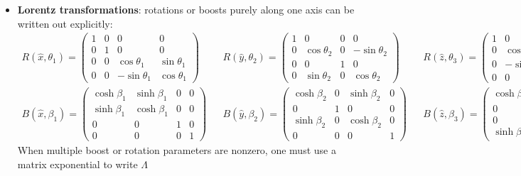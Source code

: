 \documentclass[12pt, oneside]{article}   	%
\theoremstyle{definition}
\begin{document}
\begin{itemize}
	\item \textbf{Lorentz transformations}: rotations or boosts purely along one axis can be written out explicitly:
	\tiny
	\begin{align}
		R(\hat x, \theta_1) = \begin{pmatrix} 1 & 0 & 0 & 0 \\ 0 & 1 & 0 & 0 \\ 0 & 0 & \cos\theta_1 & \sin\theta_1 \\ 0 & 0 & -\sin\theta_1 & \cos\theta_1 \end{pmatrix} 
		&&
		R(\hat y, \theta_2) = \begin{pmatrix} 1 & 0 & 0 & 0 \\ 0 & \cos\theta_2 & 0 & -\sin\theta_2 \\ 0 & 0 & 1 & 0 \\ 0 & \sin\theta_2 & 0 & \cos\theta_2 \end{pmatrix} 
		&&
		R(\hat z, \theta_3) = \begin{pmatrix} 1 & 0 & 0 & 0 \\ 0 & \cos\theta_3 & \sin\theta_3 & 0 \\ 0 & -\sin\theta_3 & \cos\theta_3 & 0 \\ 0 & 0 & 0 & 1 \end{pmatrix}
		\\
		B(\hat x, \beta_1) = \begin{pmatrix} \cosh\beta_1 & \sinh\beta_1 & 0 & 0 \\ \sinh\beta_1 & \cosh\beta_1 & 0 & 0 \\ 0 & 0 & 1 & 0 \\ 0 & 0 & 0 & 1 \end{pmatrix} 
		&&
		B(\hat y, \beta_2) = \begin{pmatrix} \cosh\beta_2 & 0 & \sinh\beta_2 & 0 \\ 0 & 1 & 0 & 0 \\ \sinh\beta_2 & 0 & \cosh\beta_2 & 0 \\ 0 & 0 & 0 & 1 \end{pmatrix} 
		&& 
		B(\hat z, \beta_3) = \begin{pmatrix} \cosh\beta_3 & 0 & 0 & \sinh\beta_3 \\ 0 & 1 & 0 & 0 \\ 0 & 0 & 1 & 0 \\ \sinh\beta_3 & 0 & 0 & \cosh\beta_3 \end{pmatrix} 
	\end{align}
	\normalsize
	When multiple boost or rotation parameters are nonzero, one must use a matrix exponential to write $\Lambda$ 

\end{itemize}
\end{document}
